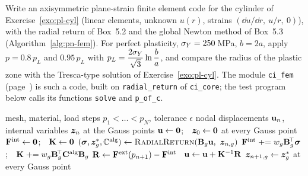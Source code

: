 
\label{exo:pn-fem}
%
Write an axisymmetric plane-strain finite element code for the cylinder of
Exercise~\ref{exo:pl-cyl} (linear elements, unknown $u(r)$, strains
$(\dd u/\dd r,\ u/r,\ 0)$), with the radial return of Box~5.2 and the global
Newton method of Box~5.3 (Algorithm~\ref{alg:pn-fem}). For perfect plasticity,
$\sigma_{Y}=250$\,MPa, $b=2a$, apply $p=0.8\,p_L$ and $0.95\,p_L$ with
$\displaystyle p_L=\frac{2\sigma_{Y}}{\sqrt3}\ln\frac ba$, and compare the radius of the plastic
zone with the Tresca-type solution of Exercise~\ref{exo:pl-cyl}. The module
\texttt{ci\_fem} (page~\pageref{sec:pn-aux}) is such a code, built on
\texttt{radial\_return} of \texttt{ci\_core}; the test program below calls its
functions \texttt{solve} and \texttt{p\_of\_c}.
\begin{algorithm}[H]
\caption{Incremental Newton solver (Box~5.3)}\label{alg:pn-fem}
\begin{algorithmic}[1]
\Require mesh, material, load steps $p_1<\dots<p_N$, tolerance $\epsilon$
\Ensure nodal displacements $\mathbf{u}_n$, internal variables $\bm{z}_n$ at the Gauss points
\State $\mathbf{u}\gets\mathbf{0}$;\ \ $\bm{z}_0\gets\bm{0}$ at every Gauss point
  \Repeat
    \State $\mathbf{F}^{\mathrm{int}}\gets\mathbf{0}$;\ \ $\mathbf{K}\gets\mathbf{0}$
      \State $(\sig,\vz^{\ast}_g,\bbCalg)\gets\textsc{RadialReturn}(\mat{B}_g\mat{u},\ \vz_{n,g})$ 
      \State $\mathbf{F}^{\mathrm{int}}\mathrel{+}=w_g\mathbf{B}_g^{\!\top}\bm{\sigma}$;\ \ $\mathbf{K}\mathrel{+}=w_g\mathbf{B}_g^{\!\top}\mathbf{C}^{\mathrm{alg}}\mathbf{B}_g$
    \EndFor
    \State $\mathbf{R}\gets\mathbf{F}^{\mathrm{ext}}(p_{n+1})-\mathbf{F}^{\mathrm{int}}$
     \ $\mathbf{u}\gets\mathbf{u}+\mathbf{K}^{-1}\mathbf{R}$ \EndIf
  \State $\bm{z}_{{n+1},g}\gets\bm{z}^{\ast}_g$ at every Gauss point 
\EndFor
\end{algorithmic}
\end{algorithm}
